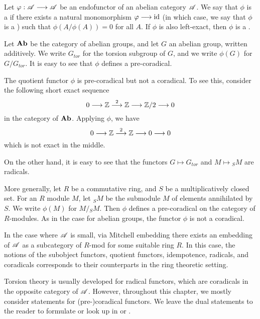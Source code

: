 \begin{defn}\label{def_radical}
Let $\varphi: \mathscr{A} \longrightarrow \mathscr{A}$ be an endofunctor of an abelian 
category $\mathscr{A}$. We say that $\phi$ is a  if 
there exists a natural monomorphism $\varphi \longrightarrow \mathrm{id}$ (in which case, we
say that $\phi$ is a ) such that 
$\phi(A/\phi(A)) = 0$ for all $A$. If $\phi$ is also left-exact, then
$\phi$ is a .
\end{defn}

\begin{ex}
Let $\mathbf{Ab}$ be the category of abelian groups, and let $G$ an
abelian group, written additively. We write $G_{tor}$ for the 
torsion subgroup of $G$, and we write $\phi(G)$ for $G/G_{tor}$.
It is easy to see that $\phi$ defines a pre-coradical.

The quotient functor $\phi$ is pre-coradical but not a coradical. 
To see this, consider the following short exact sequence
\[
0 \longrightarrow \mathbb{Z} \stackrel{2}{\longrightarrow} \mathbb{Z} \longrightarrow \mathbb{Z}/2 \longrightarrow 0
\]
in the category of $\mathbf{Ab}$. Applying $\phi$, we have
\[
0 \longrightarrow \mathbb{Z} \stackrel{2}{\longrightarrow} \mathbb{Z} \longrightarrow 0 \longrightarrow 0
\]
which is not exact in the middle.

On the other hand, it is easy to see that the functors $G \mapsto 
G_{tor}$ and $M \mapsto {}_SM$ are radicals.

More generally, let $R$ be a commutative ring, and $S$ be a 
multiplicatively closed set. For an $R$ module $M$, let ${}_SM$
be the submodule $M$ of elements annihilated by $S$. We write
$\phi(M)$ for $M/{}_SM$. Then $\phi$ defines a pre-coradical on
the category of $R$-modules. As in the case for abelian groups,
the functor $\phi$ is not a coradical.
\end{ex}

\begin{rmk}\label{rmk_mitch_embed}
  In the case where $\mathscr{A}$ is small, via Mitchell embedding there
  exists an embedding of $\mathscr{A}$ as a subcategory of $R$-mod for
  some suitable ring $R$. In this case, the notions of the subobject
  functors, quotient functors, idempotence, radicals, and coradicals
  corresponds to their counterparts in the ring theoretic setting.
\end{rmk}

Torsion theory is usually developed for radical functors, which 
are coradicals in the opposite category of $\mathscr{A}$. However, 
throughout this chapter, we mostly consider statements for
(pre-)coradical functors. We leave the dual statements to the 
reader to formulate or look up in \cite{DTor} or 
\cite[Section 1.2]{BJV}.

